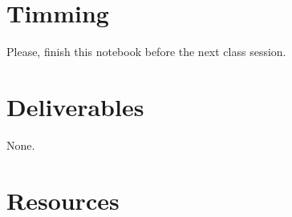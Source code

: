 \section{Timming}

Please, finish this notebook before the next class session.

\section{Deliverables}

None.

\section{Resources}


